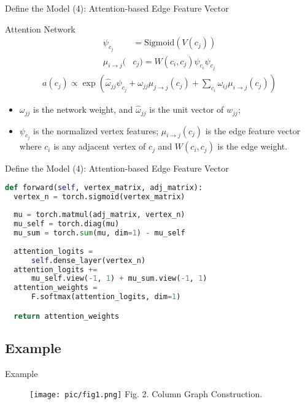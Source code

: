 \documentclass{beamer}
\begin{document}
\begin{frame}{Define the Model (4): Attention-based Edge Feature Vector}
    \begin{exampleblock}{Attention Network}
        \begin{align}
            \psi_{c_j} &= \mathrm{Sigmoid}(V(c_j))\\
            \mu_{i\to j}(&c_j) = W(c_i,c_j) \psi_{c_i}\psi_{c_j}
        \end{align}
        \begin{align}
            a(c_j) \propto \exp (\hat{\omega}_{jj}\psi_{c_j} + \omega_{jj}\mu_{j\to j}(c_j) + \sum_{c_i} \omega_{ij}\mu_{i\to j}(c_j))
        \end{align}
        \begin{itemize}
            \item ${\omega}_{jj}$ is the network weight, and $\hat{\omega}_{jj}$ is the unit vector of $w_{jj}$;
            \item $\psi_{c_j}$ is the normalized vertex features; $\mu_{i\to j}(c_j)$ is the edge feature vector where $c_i$ is any adjacent vertex of $c_j$ and $W(c_i, c_j)$ is the edge weight.
        \end{itemize}
    \end{exampleblock}
\end{frame}

\begin{frame}[fragile]{Define the Model (4): Attention-based Edge Feature Vector}
    \begin{minipage}{1.0\linewidth}
\begin{lstlisting}[language=Python]
def forward(self, vertex_matrix, adj_matrix):
  vertex_n = torch.sigmoid(vertex_matrix)
  
  mu = torch.matmul(adj_matrix, vertex_n)
  mu_self = torch.diag(mu)
  mu_sum = torch.sum(mu, dim=1) - mu_self
  
  attention_logits = 
      self.dense_layer(vertex_n)
  attention_logits += 
      mu_self.view(-1, 1) + mu_sum.view(-1, 1)
  attention_weights =
      F.softmax(attention_logits, dim=1)

  return attention_weights
\end{lstlisting}
    \end{minipage}    
\end{frame}

\subsection{Example}
\begin{frame}{Example}
    \begin{figure}[htpb]
        \centering
        \texttt{[image: pic/fig1.png]}
        \tiny{Fig. 2. Column Graph Construction.}
    \end{figure}
\end{frame}
\end{document}
